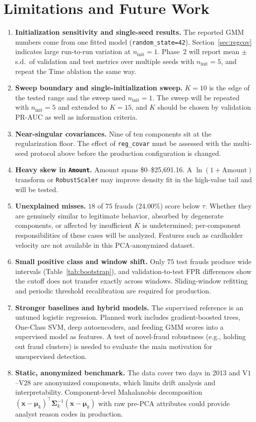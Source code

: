 \documentclass[conference]{IEEEtran}
\begin{document}
\section{Limitations and Future Work}

\begin{enumerate}
    \item \textbf{Initialization sensitivity and single-seed results.} The reported GMM numbers come from one fitted model (\texttt{random\_state=42}). Section~\ref{sec:regcov} indicates large run-to-run variation at $n_{\text{init}}=1$. Phase~2 will report mean $\pm$ s.d.\ of validation and test metrics over multiple seeds with $n_{\text{init}}=5$, and repeat the Time ablation the same way.
    \item \textbf{Sweep boundary and single-initialization sweep.} $K=10$ is the edge of the tested range and the sweep used $n_{\text{init}}=1$. The sweep will be repeated with $n_{\text{init}}=5$ and extended to $K=15$, and $K$ should be chosen by validation PR-AUC as well as information criteria.
    \item \textbf{Near-singular covariances.} Nine of ten components sit at the regularization floor. The effect of \texttt{reg\_covar} must be assessed with the multi-seed protocol above before the production configuration is changed.
    \item \textbf{Heavy skew in \texttt{Amount}.} $\text{Amount}$ spans \$0--\$25,691.16. A $\ln(1+\text{Amount})$ transform or \texttt{RobustScaler} may improve density fit in the high-value tail and will be tested.
    \item \textbf{Unexplained misses.} $18$ of $75$ frauds ($24.00\%$) score below $\tau$. Whether they are genuinely similar to legitimate behavior, absorbed by degenerate components, or affected by insufficient $K$ is undetermined; per-component responsibilities of these cases will be analyzed. Features such as cardholder velocity are not available in this PCA-anonymized dataset.
    \item \textbf{Small positive class and window shift.} Only $75$ test frauds produce wide intervals (Table~\ref{tab:bootstrap}), and validation-to-test FPR differences show the cutoff does not transfer exactly across windows. Sliding-window refitting and periodic threshold recalibration are required for production.
    \item \textbf{Stronger baselines and hybrid models.} The supervised reference is an untuned logistic regression. Planned work includes gradient-boosted trees, One-Class SVM, deep autoencoders, and feeding GMM scores into a supervised model as features. A test of novel-fraud robustness (e.g., holding out fraud clusters) is needed to evaluate the main motivation for unsupervised detection.
    \item \textbf{Static, anonymized benchmark.} The data cover two days in 2013 and $\text{V1}$--$\text{V28}$ are anonymized components, which limits drift analysis and interpretability. Component-level Mahalanobis decomposition $(\mathbf{x} - \boldsymbol{\mu}_k)^{\top}\boldsymbol{\Sigma}_k^{-1}(\mathbf{x} - \boldsymbol{\mu}_k)$ with raw pre-PCA attributes could provide analyst reason codes in production.
\end{enumerate}
\end{document}
